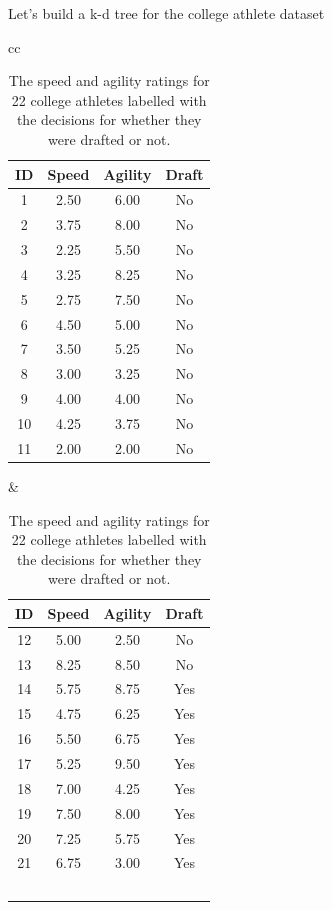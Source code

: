 \documentclass[xcolor={table}]{beamer}
\begin{document}
\begin{frame} 
\begin{example}
Let's build a k-d tree for the college athlete dataset 

\begin{table}[htb]
\caption{The speed and agility ratings for 22 college athletes labelled with the decisions for whether they were drafted or not. }
\label{table:kddataset}
\centering
\begin{footnotesize}
\begin{tabular}{cc}
		\hline
			\begin{minipage}{0.45\textwidth}
				\centering
				\begin{footnotesize}
					\begin{tabular}[ht]{cccc} 
\textbf{ID}	 & \textbf{Speed} & \textbf{Agility} & \textbf{Draft}\\
\hline
1 & 2.50 & 6.00 & No\\
2 & 3.75 & 8.00 & No\\
3 & 2.25 & 5.50 & No\\
4 & 3.25 & 8.25 & No\\
5 & 2.75 & 7.50 & No\\
6 & 4.50 & 5.00 & No\\
7 & 3.50 & 5.25 & No\\
8 & 3.00 & 3.25 & No\\
9 & 4.00 & 4.00 & No\\
10 & 4.25 & 3.75 & No\\
11 & 2.00 & 2.00 & No\\
\hline
					\end{tabular}
				\end{footnotesize}
			\end{minipage}
			&
			\begin{minipage}{0.45\textwidth}
				\centering
					\begin{footnotesize}
					\begin{tabular}[ht]{cccc} 
\textbf{ID}	 & \textbf{Speed} & \textbf{Agility} & \textbf{Draft}\\
\hline
12 & 5.00 & 2.50 & No\\
13 & 8.25 & 8.50 & No\\
14 & 5.75 & 8.75 & Yes\\
15 & 4.75 & 6.25 & Yes\\
16 & 5.50 & 6.75 & Yes\\
17 & 5.25 & 9.50 & Yes\\
18 & 7.00 & 4.25 & Yes\\
19 & 7.50 & 8.00 & Yes\\
20 & 7.25 & 5.75 & Yes\\
21 & 6.75 & 3.00 & Yes\\
~& ~ & ~ & ~\\
\hline
				\end{tabular}
				\end{footnotesize}
			\end{minipage}\\
\end{tabular}
\end{footnotesize}
\end{table}
\end{example}
\end{frame} 
\end{document}
